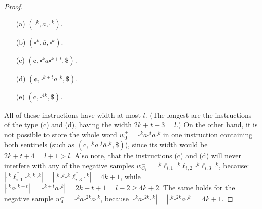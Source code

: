 \begin{proof}
\begin{enumerate}
\item[(a)] $(\square^k, a, \square^k)$.
\item[(b)] $(\square^k, \overline{a}, \square^k)$.
\item[(c)] $(\cent, \square^k a \square^{k+t}, \$)$.
\item[(d)] $(\cent, \square^{k+t} \overline{a} \square^k, \$)$.
\item[(e)] $(\cent, \square^{4k}, \$)$.
\end{enumerate}
All of these instructions have width at most $l$. 
(The longest are the instructions of the type 
(c) and (d), having the width $2k + t + 3 = l$.)
On the other hand, it is not possible to 
store the whole word
$w_0^+ = \square^k a \square^t \overline{a} \square^k$ 
in one instruction containing both sentinels (such as  
$(\cent, \square^k a \square^t \overline{a} \square^k, \$)$),
since its width would be $2k + t + 4 = l + 1 > l$.
Also note, that the instructions (c) and (d) will never 
interfere with any of the negative samples 
$w_{C_i}^- = \square^k \overline{\ell_{i,1}} \square^k \overline{\ell_{i,2}} 
\square^k \overline{\ell_{i,3}} \square^k$,
because: 
$|\square^k \overline{\ell_{i,1}} \square^k \square^k \square^k| = 
|\square^k \square^k \square^k \overline{\ell_{i,3}} \square^k| = 4k + 1$,
while $|\square^k a \square^{k+t}| = |\square^{k+t} \overline{a} \square^k| =
2k + t + 1 = l - 2 \ge 4k + 2$. The same holds for the negative
sample $w_4^- = \square^k a \square^{2k}  \overline{a} \square^k$,
because $|\square^k a \square^{2k} \square^k| = 
|\square^k \square^{2k}  \overline{a} \square^k| = 4k + 1$.


\end{proof}

